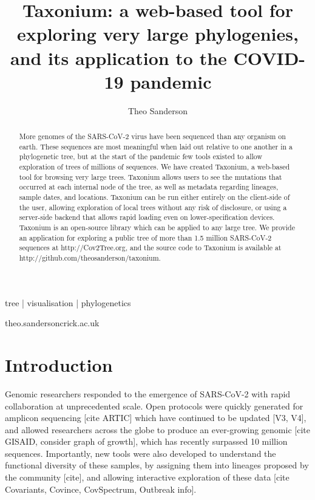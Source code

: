 
\title{Taxonium: a web-based tool for exploring very large phylogenies, and its application to the COVID-19 pandemic}

\author[1]{Theo Sanderson }

\date{}

\maketitle

\begin{abstract}
More genomes of the SARS-CoV-2 virus have been sequenced than any organism on earth. These sequences are most meaningful when laid out relative to one another in a phylogenetic tree, but at the start of the pandemic few tools existed to allow exploration of trees of millions of sequences. We have created Taxonium, a web-based tool for browsing very large trees. Taxonium allows users to see the mutations that occurred at each internal node of the tree, as well as metadata regarding lineages, sample dates, and locations. Taxonium can be run either entirely on the client-side of the user, allowing exploration of local trees without any risk of disclosure, or using a server-side backend that allows rapid loading even on lower-specification devices. Taxonium is an open-source library which can be applied to any large tree. We provide an application for exploring a public tree of more than 1.5 million SARS-CoV-2 sequences at http://Cov2Tree.org, and the source code to Taxonium is available at http://github.com/theosanderson/taxonium.

\lipsum[1]
\end{abstract}

\begin{keywords}
tree | visualisation | phylogenetics
\end{keywords}

\begin{corrauthor}
theo.sanderson\at crick.ac.uk
\end{corrauthor}

\section*{Introduction}\label{s:introduction}

Genomic researchers responded to the emergence of SARS-CoV-2 with rapid collaboration at unprecedented scale. Open protocols were quickly generated for amplicon sequencing [cite ARTIC] which have continued to be updated [V3, V4], and allowed researchers across the globe to produce an ever-growing genomic [cite GISAID, consider graph of growth], which has recently surpassed 10 million sequences. Importantly, new tools were also developed to understand the functional diversity of these samples, by assigning them into lineages proposed by the community [cite], and allowing interactive exploration of these data [cite Covariants, Covince, CovSpectrum, Outbreak info].

